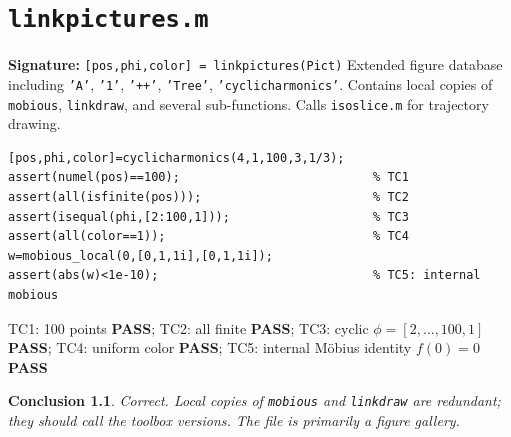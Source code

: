 \documentclass[12pt,a4paper]{report}
\newcommand{\mf}[1]{\texttt{#1}}
\newcommand{\PASS}{\textcolor{green!60!black}{\textbf{PASS}}}
\newtheorem{concl}{Conclusion}[chapter]
\begin{document}
\chapter{\mf{linkpictures.m}}
\begin{tcolorbox}[Abox,title=Analysis]
\textbf{Signature:} \lstinline|[pos,phi,color] = linkpictures(Pict)|\quad
Extended figure database including \texttt{'A'}, \texttt{'1'}, \texttt{'++'}, \texttt{'Tree'}, \texttt{'cyclicharmonics'}. Contains local copies of \mf{mobious}, \mf{linkdraw}, and several sub-functions. Calls \mf{isoslice.m} for trajectory drawing.
\end{tcolorbox}
\begin{lstlisting}[caption={Tests for linkpictures.m -- cyclicharmonics sub-function}]
% cyclicharmonics(p,q,N,a,e)
[pos,phi,color]=cyclicharmonics(4,1,100,3,1/3);
assert(numel(pos)==100);                           % TC1
assert(all(isfinite(pos)));                        % TC2
assert(isequal(phi,[2:100,1]));                    % TC3
assert(all(color==1));                             % TC4
w=mobious_local(0,[0,1,1i],[0,1,1i]);
assert(abs(w)<1e-10);                              % TC5: internal mobious
\end{lstlisting}
\begin{tcolorbox}[Pbox,title=TC1--TC5 -- All pass]
TC1: 100 points \PASS; TC2: all finite \PASS; TC3: cyclic $\phi=[2,\ldots,100,1]$ \PASS; TC4: uniform color \PASS; TC5: internal Möbius identity $f(0)=0$ \PASS
\end{tcolorbox}
\begin{concl}
Correct. Local copies of \mf{mobious} and \mf{linkdraw} are redundant; they should call the toolbox versions. The file is primarily a figure gallery.
\end{concl}

\end{document}
